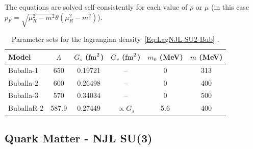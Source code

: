\documentclass[prc, reprint, amsmath, floatfix,10pt]{revtex4-1}
\begin{document}
The equations are solved self-consistently for each value of $\rho$ or $\mu$ (in this case $p_F = \sqrt{\mu_R^2 - m^2}\theta(\mu_R^2 - m^2)$).

\begin{table}[!htpb]
\centering
\caption{Parameter sets for the lagrangian density~\eqref{Eq:LagNJL-SU2-Bub} \cite{Buballa1996, Buballa2005}. \label{Tab:Parametros_NJL}}
\begin{ruledtabular}
\begin{tabular}{lccccc}
Model &  $\Lambda$ & $G_s$ ($\rm{fm}^2$) & $G_v$ ($\rm{fm}^2$) & $m_0$ (MeV) & $m$ (MeV) \\
\hline
Buballa-1 & 650 & 0.19721 & -- & 0 & 313 \\
Buballa-2 & 600 & 0.26498 & -- & 0 & 400 \\
Buballa-3 & 570 & 0.34034 & -- & 0 & 500 \\
BuballaR-2 & 587.9 & 0.27449 & $\propto G_s$ & 5.6 & 400 \\
\end{tabular}
\end{ruledtabular}
\end{table}

\subsection{Quark Matter - NJL SU(3)}\label{NJLSU3}
\end{document}
